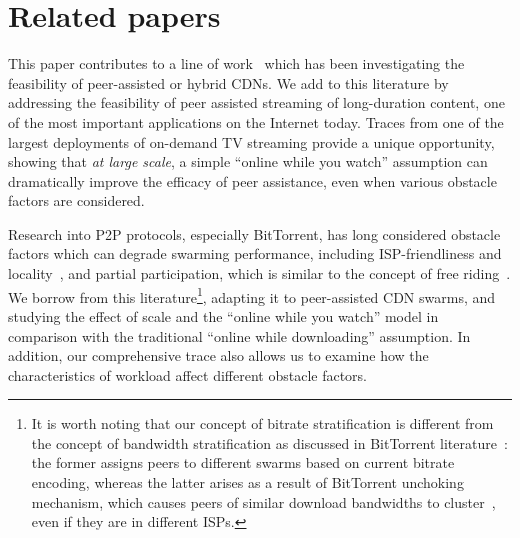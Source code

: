 \documentclass[10pt, conference, letterpaper]{IEEEtran}
\begin{document}
 

%
 \section{Related papers}
This paper contributes to a line of work~\cite{huang2007can,huang2008understanding,zhao2013peer,balachandran2013analyzing} which has been investigating the feasibility of peer-assisted or hybrid CDNs. We add to this literature by addressing the feasibility of peer assisted streaming of long-duration content, one of the most important applications on the Internet today. Traces from one of the largest deployments of on-demand TV streaming provide a unique opportunity, showing that \emph{at large scale}, a simple ``online while you watch'' assumption can dramatically improve the efficacy of peer assistance, even when various obstacle factors are considered. 

Research into P2P protocols, especially BitTorrent, has long considered obstacle factors which can degrade swarming performance, including ISP-friendliness and locality~\cite{karagiannis2005should,le2011pushing,cuevas2013bittorrent}, and partial participation, which is similar to the concept of free riding~\cite{adar2000free,jun2005incentives,sirivianos2007free}. We borrow from this literature\footnote{It is worth noting that our concept of bitrate stratification is  different from the concept of bandwidth stratification as discussed in BitTorrent literature~\cite{cuevas2013bittorrent}: the former assigns peers to different swarms based on current bitrate encoding, whereas the latter arises as a result of BitTorrent unchoking mechanism, which causes peers of similar download bandwidths to cluster~\cite{legout2007clustering}, even if they are in different ISPs.}, adapting it to peer-assisted CDN swarms, and studying the effect of scale and the ``online while you watch'' model in comparison with the traditional ``online while downloading'' assumption.  In addition, our comprehensive trace also allows us to examine how the characteristics of workload affect different obstacle factors. 
\end{document}

